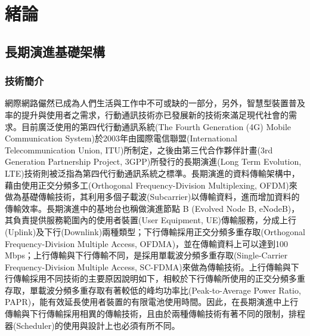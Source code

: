 %
\chapter{緒論}
\label{ch:intro}
\section{長期演進基礎架構}
\subsection{技術簡介}
網際網路儼然已成為人們生活與工作中不可或缺的一部分，另外，智慧型裝置普及率的提升與使用者之需求，行動通訊技術亦已發展新的技術來滿足現代社會的需求。目前廣泛使用的第四代行動通訊系統(The Fourth Generation (4G) Mobile Communication System)於2003年由國際電信聯盟(International Telecommunication Union, ITU)所制定，之後由第三代合作夥伴計畫(3rd Generation Partnership Project, 3GPP)所發行的長期演進(Long Term Evolution, LTE)技術則被泛指為第四代行動通訊系統之標準。長期演進的資料傳輸架構中，藉由使用正交分頻多工(Orthogonal Frequency-Division Multiplexing, OFDM)來做為基礎傳輸技術，其利用多個子載波(Subcarrier)以傳輸資料，進而增加資料的傳輸效率。長期演進中的基地台也稱做演進節點 B (Evolved Node B, eNodeB)，其負責提供服務範圍內的使用者裝置(User Equipment, UE)傳輸服務，分成上行(Uplink)及下行(Downlink)兩種類型；下行傳輸採用正交分頻多重存取(Orthogonal Frequency-Division Multiple Access, OFDMA)，並在傳輸資料上可以達到100 Mbps；上行傳輸與下行傳輸不同，是採用單載波分頻多重存取(Single-Carrier Frequency-Division Multiple Access, SC-FDMA)來做為傳輸技術\cite{abu2014uplink}。上行傳輸與下行傳輸採用不同技術的主要原因說明如下，相較於下行傳輸所使用的正交分頻多重存取，單載波分頻多重存取有著較低的峰均功率比(Peak-to-Average Power Ratio, PAPR)\cite{rana2010}，能有效延長使用者裝置的有限電池使用時間。因此，在長期演進中上行傳輸與下行傳輸採用相異的傳輸技術，且由於兩種傳輸技術有著不同的限制，排程器(Scheduler)的使用與設計上也必須有所不同。



